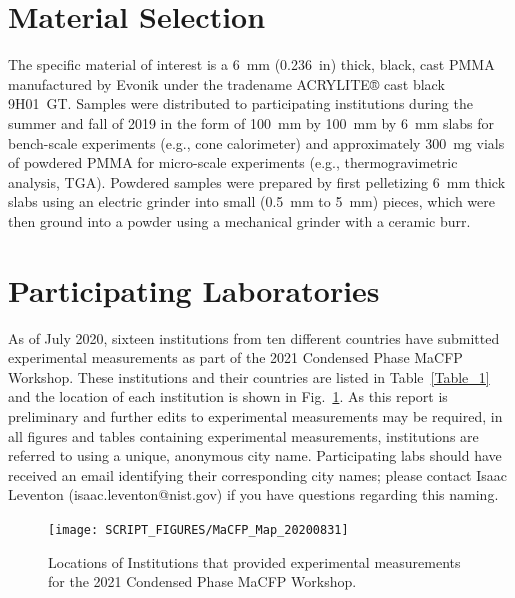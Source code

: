 \documentclass{book}
\begin{document}
\section{Material Selection}

The specific material of interest is a 6~mm (0.236~in) thick, black, cast PMMA manufactured by Evonik under the tradename ACRYLITE® cast black 9H01~GT. Samples were distributed to participating institutions during the summer and fall of 2019 in the form of 100~mm by 100~mm by 6~mm slabs for bench-scale experiments (e.g., cone calorimeter) and approximately 300~mg vials of powdered PMMA for micro-scale experiments (e.g., thermogravimetric analysis, TGA). Powdered samples were prepared by first pelletizing 6~mm thick slabs using an electric grinder into small (0.5~mm to 5~mm) pieces, which were then ground into a powder using a mechanical grinder with a ceramic burr.

\section{Participating Laboratories}

As of July 2020, sixteen institutions from ten different countries have submitted experimental measurements as part of the 2021 Condensed Phase MaCFP Workshop. These institutions and their countries are listed in Table~\ref{Table_1} and the location of each institution is shown in Fig.~\ref{Fig:MaCFP_Map_20200831}. As this report is preliminary and further edits to experimental measurements may be required, in all figures and tables containing experimental measurements, institutions are referred to using a unique, anonymous city name. Participating labs should have received an email identifying their corresponding city names; please contact Isaac Leventon (isaac.leventon@nist.gov) if you have questions regarding this naming.

\begin{figure}
  \centering
  \texttt{[image: SCRIPT\_FIGURES/MaCFP\_Map\_20200831]}
  \caption{Locations of Institutions that provided experimental measurements for the 2021 Condensed Phase MaCFP Workshop.}
  \label{Fig:MaCFP_Map_20200831}
\end{figure}
\end{document}
